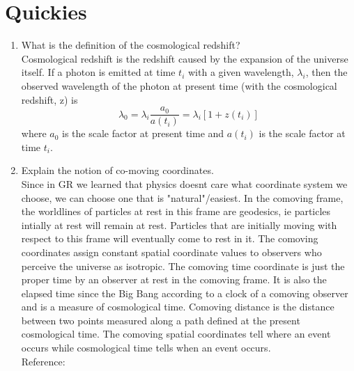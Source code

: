 \section{Quickies}
\begin{enumerate}[label=(\alph*)]
	\item What is the definition of the cosmological redshift? \\
		Cosmological redshift is the redshift caused by the expansion of the universe itself. If a photon is emitted at time $t_i$ with a given wavelength, $\lambda_i$, then the observed wavelength of the photon at present time (with the cosmological redshift, z) is 
		\begin{equation}
			\lambda_0 = \lambda_i \frac{a_0}{a(t_i)} = \lambda_i \left[ 1 + z(t_i) \right]
		\end{equation}
where $a_0$ is the scale factor at present time and $a(t_i)$ is the scale factor at time $t_i$.

	\item Explain the notion of co-moving coordinates. \\
      Since in GR we learned that physics doesnt care what coordinate system we choose, we can choose one that is "natural"/easiest. 	In the comoving frame, the worldlines of particles at rest in this frame are geodesics, ie particles intially at rest will remain at rest. Particles that are initially moving with respect to this frame will eventually come to rest in it. The comoving coordinates assign constant spatial coordinate values to observers who perceive the universe as isotropic. The comoving time coordinate is just the proper time by an observer at rest in the comoving frame. It is also the elapsed time since the Big Bang according to a clock of a comoving observer and is a measure of cosmological time. Comoving distance is the distance between two points measured along a path defined at the present cosmological time. The comoving spatial coordinates tell where an event occurs while cosmological time tells when an event occurs\cite{wiki:comoving}\cite{KaT}.\\
Reference:\\
\end{enumerate} 
